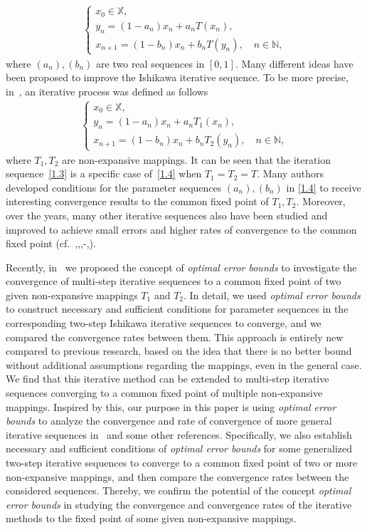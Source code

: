 \documentclass[a4paper, 11pt]{article}
\begin{document}
    \begin{align*}\label{1.3}
			\begin{cases} 
   x_0\in \mathbb X,\\
   y_n = (1-a_n)x_n + a_nT(x_n), \\ x_{n+1} = (1-b_n)x_n + b_nT(y_n), \quad n \in \mathbb N,\tag{1.3}
			\end{cases}
		\end{align*}
where $(a_n),(b_n)$ are two real sequences in $[0,1]$. Many different ideas have been proposed
to improve the Ishikawa iterative sequence. To be more precise, in~\cite{TT1998,YC2007}, an iterative process was defined as follows  
\begin{align*}\label{1.4}
    \begin{cases} 
   x_0\in \mathbb X,\\
   y_n = (1-a_n)x_n + a_nT_1(x_n), \\ 
   x_{n+1} = (1-b_n)x_n + b_nT_2(y_n), \quad n \in \mathbb N,\tag{1.4}
\end{cases}
\end{align*}
where $T_1,T_2$ are non-expansive mappings. It can be seen that the iteration sequence~\eqref{1.3} is a specific case of~\eqref{1.4} when $T_1=T_2=T$. Many authors developed conditions for the parameter sequences $(a_n),(b_n)$ in \eqref{1.4} to receive interesting convergence results to the common fixed point of $T_1,T_2$. Moreover, over the years, many other iterative sequences also have been studied and improved to achieve small errors and higher rates of convergence to the common fixed point (cf.~\cite{Berinde2008},\cite{CCK2003},\cite{KX2005},\cite{Noor}-\cite{SP2011},\cite{Xue}).\medskip

Recently, in~\cite{paper2} we proposed the concept of \textit{optimal error bounds} to investigate the convergence of multi-step iterative sequences to a common fixed point of two given non-expansive mappings $T_1$ and $T_2$. In detail, we used \textit{optimal error bounds} to construct necessary and sufficient conditions for parameter sequences in the corresponding two-step Ishikawa iterative sequences to converge, and we compared the convergence rates between them. This approach is entirely new compared to previous research, based on the idea that there is no better bound without additional assumptions regarding the mappings, even in the general case. We find that this iterative method can be extended to multi-step iterative sequences converging to a common fixed point of multiple non-expansive mappings. Inspired by this, our purpose in this paper is using \textit{optimal error bounds} to analyze the convergence and rate of convergence of more general iterative sequences in~\cite{DungHieu} and some other references. Specifically, we also establish necessary and sufficient conditions of \textit{optimal error bounds} for some generalized two-step iterative sequences to converge to a common fixed point of two or more non-expansive mappings, and then compare the convergence rates between the considered sequences. Thereby, we confirm the potential of the concept \textit{optimal error bounds} in studying the convergence and convergence rates of the iterative methods to the fixed point of some given non-expansive mappings.\medskip
\end{document}

